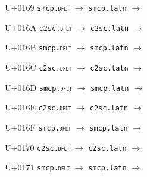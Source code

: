 \documentclass{article}
\begin{document}
\begin{substitutions}
\goodbreak

U+0169  \linebreak
    \texttt{smcp.\textsc{dflt}} $\to$  \linebreak
    \texttt{smcp.latn} $\to$  

\goodbreak

U+016A  \linebreak
    \texttt{c2sc.\textsc{dflt}} $\to$  \linebreak
    \texttt{c2sc.latn} $\to$  

\goodbreak

U+016B  \linebreak
    \texttt{smcp.\textsc{dflt}} $\to$  \linebreak
    \texttt{smcp.latn} $\to$  

\goodbreak

U+016C  \linebreak
    \texttt{c2sc.\textsc{dflt}} $\to$  \linebreak
    \texttt{c2sc.latn} $\to$  

\goodbreak

U+016D  \linebreak
    \texttt{smcp.\textsc{dflt}} $\to$  \linebreak
    \texttt{smcp.latn} $\to$  

\goodbreak

U+016E  \linebreak
    \texttt{c2sc.\textsc{dflt}} $\to$  \linebreak
    \texttt{c2sc.latn} $\to$  

\goodbreak

U+016F  \linebreak
    \texttt{smcp.\textsc{dflt}} $\to$  \linebreak
    \texttt{smcp.latn} $\to$  

\goodbreak

U+0170  \linebreak
    \texttt{c2sc.\textsc{dflt}} $\to$  \linebreak
    \texttt{c2sc.latn} $\to$  

\goodbreak

U+0171  \linebreak
    \texttt{smcp.\textsc{dflt}} $\to$  \linebreak
    \texttt{smcp.latn} $\to$  


\end{substitutions}
\end{document}
